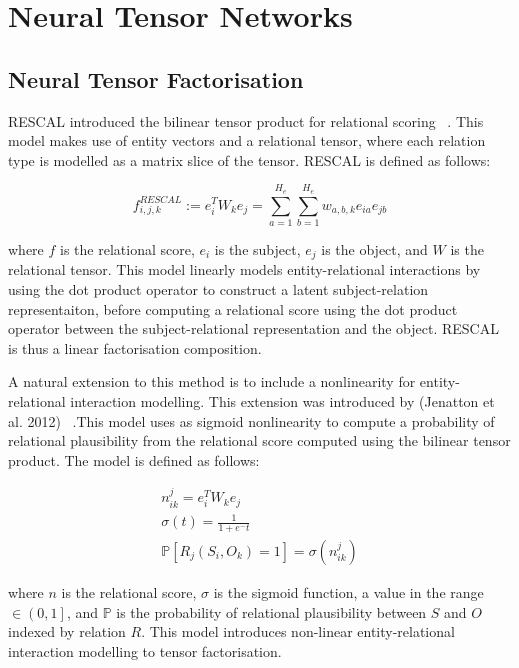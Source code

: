 
\section{Neural Tensor Networks}

\subsection{Neural Tensor Factorisation}
RESCAL introduced the bilinear tensor product for relational scoring ~\citep{nickel2011three}. This model makes use of entity vectors and a relational tensor, where each relation type is modelled as a matrix slice of the tensor. RESCAL is defined as follows:

\begin{equation}
	f_{i, j, k}^{RESCAL} := e_i^TW_ke_j = \sum_{a=1}^{H_e}\sum_{b=1}^{H_e}w_{a,b,k}e_{ia}e_{jb}
\end{equation}

where $f$ is the relational score, $e_i$ is the subject, $e_j$ is the object, and $W$ is the relational tensor. This model linearly models entity-relational interactions by using the dot product operator to construct a latent subject-relation representaiton, before computing a relational score using the dot product operator between the subject-relational representation and the object. RESCAL is thus a linear factorisation composition. \bigskip

A natural extension to this method is to include a nonlinearity for entity-relational interaction modelling. This extension was introduced by (Jenatton et al. 2012) ~\citep{jenatton2012latent}.This model uses as sigmoid nonlinearity to compute a probability of relational plausibility from the relational score computed using the bilinear tensor product. \newline
The model is defined as follows:

\begin{subequations}
	\begin{gather}
		n_{ik}^{j} = e_i^TW_ke_j \\
		\sigma(t) = \frac{1}{1 + e^-t} \\
		\mathbb{P}\left [ R_j(S_i, O_k) = 1 \right ] = \sigma(n_{ik}^{j})
	\end{gather}
\end{subequations}

where $n$ is the relational score, $\sigma$ is the sigmoid function, a value in the range $\in \left ( 0, 1 \right ]$, and $\mathbb{P}$ is the probability of relational plausibility between $S$ and $O$ indexed by relation $R$. This model introduces non-linear entity-relational interaction modelling to tensor factorisation. 

